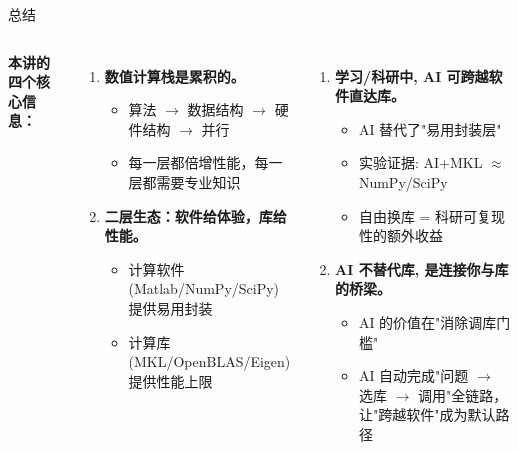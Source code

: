 \documentclass[12pt,aspectratio=169]{beamer}
\begin{document}
\begin{frame}[shrink]{总结}

\small
\begin{columns}[T]
\textbf{本讲的四个核心信息：}
\begin{enumerate}\itemsep2pt
  \item \textbf{数值计算栈是累积的。}
  \begin{itemize}\itemsep0pt
    \item 算法 $\to$ 数据结构 $\to$ 硬件结构 $\to$ 并行
    \item 每一层都倍增性能，每一层都需要专业知识
  \end{itemize}

  \item \textbf{二层生态：软件给体验，库给性能。}
  \begin{itemize}\itemsep0pt
    \item 计算软件 (Matlab/NumPy/SciPy) 提供易用封装
    \item 计算库 (MKL/OpenBLAS/Eigen) 提供性能上限
  \end{itemize}
\end{enumerate}

\begin{enumerate}\itemsep2pt
  \item \textbf{学习/科研中, AI 可跨越软件直达库。}
  \begin{itemize}\itemsep0pt
    \item AI 替代了"易用封装层"
    \item 实验证据: AI+MKL $\approx$ NumPy/SciPy
    \item 自由换库 = 科研可复现性的额外收益
  \end{itemize}

  \item \textbf{AI 不替代库, 是连接你与库的桥梁。}
  \begin{itemize}\itemsep0pt
    \item AI 的价值在"消除调库门槛"
    \item AI 自动完成"问题 $\to$ 选库 $\to$ 调用"全链路，让"跨越软件"成为默认路径
  \end{itemize}
\end{enumerate}

\end{columns}
\end{frame}
\end{document}
